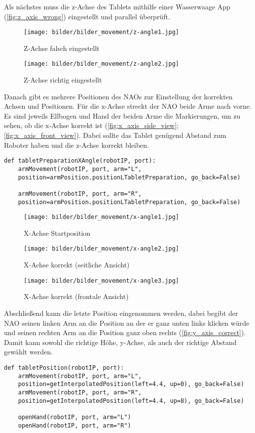 Als nächstes muss die z-Achse des Tablets mithilfe einer Wasserwaage App (\vref{fig:z_axis_wrong}) eingestellt und parallel überprüft.
 \begin{figure}[!htbp]
 \centering
    \texttt{[image: bilder/bilder\_movement/z-angle1.jpg]}
        \caption{Z-Achse falsch eingestellt}
            \label{fig:z_axis_wrong}
\end{figure}
 \begin{figure}[!htbp]
 \centering
    \texttt{[image: bilder/bilder\_movement/z-angle2.jpg]}
        \caption{Z-Achse richtig eingestellt}
            \label{fig:z_axis_right}
\end{figure}
Danach gibt es mehrere Positionen des NAOs zur Einstellung der korrekten Achsen und Positionen. Für die x-Achse streckt der NAO beide Arme nach vorne. Es sind jeweils Ellbogen und Hand der beiden Arme die Markierungen, um zu sehen, ob die x-Achse korrekt ist (\vref{fig:x_axis_side_view}; \vref{fig:x_axis_front_view}). Dabei sollte das Tablet genügend Abstand zum Roboter haben und die z-Achse korrekt bleiben.
\begin{verbatim}
def tabletPreparationXAngle(robotIP, port):
    armMovement(robotIP, port, arm="L", 
    position=armPosition.positionLTabletPreparation, go_back=False)

    armMovement(robotIP, port, arm="R", 
    position=armPosition.positionLTabletPreparation, go_back=False)
\end{verbatim}
 \begin{figure}[!htbp]
 \centering
    \texttt{[image: bilder/bilder\_movement/x-angle1.jpg]}
        \caption{X-Achse Startposition}
            \label{fig:x_axis_start}
\end{figure}
 \begin{figure}[!htbp]
 \centering
    \texttt{[image: bilder/bilder\_movement/x-angle2.jpg]}
        \caption{X-Achse korrekt (seitliche Ansicht)}
            \label{fig:x_axis_side_view}
\end{figure}
 \begin{figure}[!htbp]
 \centering
    \texttt{[image: bilder/bilder\_movement/x-angle3.jpg]}
    \caption{X-Achse korrekt (frontale Ansicht)}
            \label{fig:x_axis_front_view}
\end{figure}
Abschließend kann die letzte Position eingenommen werden, dabei begibt der NAO seinen linken Arm an die Position an der er ganz unten links klicken würde und seinen rechten Arm an die Position ganz oben rechts (\vref{fig:y_axis_correct}). Damit kann sowohl die richtige Höhe, y-Achse, als auch der richtige Abstand gewählt werden. 
\begin{verbatim}
def tabletPosition(robotIP, port):
    armMovement(robotIP, port, arm="L", 
    position=getInterpolatedPosition(left=4.4, up=0), go_back=False)
    armMovement(robotIP, port, arm="R", 
    position=getInterpolatedPosition(left=4.4, up=8), go_back=False)

    openHand(robotIP, port, arm="L")
    openHand(robotIP, port, arm="R")
\end{verbatim}

